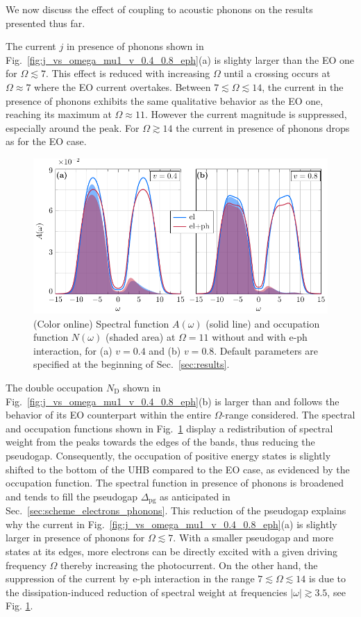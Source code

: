 \documentclass[aps,prb,groupedaddress,showpacs,twocolumn,superscriptaddress,10pt]{revtex4-2}
\begin{document}
We now discuss the effect of coupling to acoustic phonons on the results presented thus far. 
  
The current $j$ in presence of phonons shown in Fig.~\ref{fig:j_vs_omega_mu1_v_0.4_0.8_eph}(a) is slighty larger than the EO one for $\Omega\lesssim7$. This effect is reduced with increasing $\Omega$ until a crossing occurs at $\Omega\approx7$ where the EO current overtakes. Between $7\lesssim\Omega\lesssim14$, the current in the presence of phonons exhibits the same qualitative behavior as the EO one, reaching its maximum at $\Omega\approx 11$. However the current magnitude is suppressed, especially around the peak. For $\Omega\gtrsim14$ the current in presence of phonons drops as for the EO case.

\begin{figure}[b]
\includegraphics[width=\linewidth]{Fig6.pdf}
\caption{(Color online) Spectral function $A(\omega)$ (solid line) and occupation function $N(\omega)$ (shaded area) at $\Omega=11$ without and with e-ph interaction, for (a) $v=0.4$ and (b) $v=0.8$. Default parameters are specified at the beginning of Sec.~\ref{sec:results}.} 
\label{fig:spec_filling_mu1_v_0.4_0.8_O_11_eph}
\end{figure}

The double occupation $N_{\text{D}}$  shown in Fig.~\ref{fig:j_vs_omega_mu1_v_0.4_0.8_eph}(b) is larger than and follows the behavior of its EO counterpart within the entire $\Omega$-range considered. The spectral and occupation functions  shown in Fig.~\ref{fig:spec_filling_mu1_v_0.4_0.8_O_11_eph} display a redistribution of spectral weight from the peaks towards the edges of the bands, thus reducing the pseudogap. Consequently, the occupation of positive energy states is slightly shifted to the bottom of the UHB compared to the EO case, as evidenced by the occupation function. The spectral function in presence of phonons is broadened and tends to fill the pseudogap $\Delta_{\text{pg}}$ as anticipated in Sec.~\ref{sec:scheme_electrons_phonons}. This reduction of the pseudogap explains why the current in Fig.~\ref{fig:j_vs_omega_mu1_v_0.4_0.8_eph}(a) is slightly larger in presence of phonons for $\Omega\lesssim7$. With a smaller pseudogap and more states at its edges, more electrons can be directly excited with a given driving frequency $\Omega$ thereby increasing the photocurrent. On the other hand, the suppression of the current by e-ph interaction in the range $7\lesssim\Omega\lesssim14$ is due to the dissipation-induced reduction of spectral weight at frequencies $|\omega| \gtrsim 3.5$, see Fig. \ref{fig:spec_filling_mu1_v_0.4_0.8_O_11_eph}. 
\end{document}
